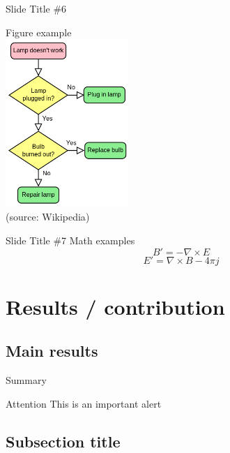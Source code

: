 \documentclass{beamer}
\begin{document}
\begin{frame}{Slide Title \#6}
	\begin{center}
		Figure example \\[12pt]
		\includegraphics[width=0.35\textwidth,keepaspectratio]{LampFlowchart.png}
		\\
		\footnotesize(source: \textlatin{Wikipedia})
    \end{center}
\end{frame}

\begin{frame}{Slide Title \#7}
	\centering
	Math examples \\[12pt]
	\begin{equation}
        	B'=-\nabla \times E
	\end{equation}
	\begin{equation*}
        	E'=\nabla \times B - 4\pi j
	\end{equation*}
\end{frame}

\section{Results / contribution}

\subsection{Main results}

\begin{frame}{Summary}
   	\begin{alertblock}{Attention}
   		\textlatin{This is an important alert}
   	\end{alertblock}
\end{frame}

%
\subsection{Subsection title}
\end{document}

